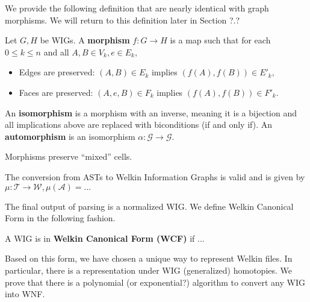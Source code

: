 We provide the following definition that are nearly identical with graph morphisms. We will return to this definition later in Section ?.?
\begin{definition} Let $G, H$ be WIGs. A \textbf{morphism} $f: G \to H$ is a map such that for each $0 \leq k \leq n$ and all $A, B \in V_{k}, e \in E_{k},$
  \begin{itemize}
    \item Edges are preserved: $(A, B) \in E_{k}$ implies $(f(A), f(B)) \in E'_{k},$
    \item Faces are preserved: $(A, e, B) \in F_{k}$ implies $(f(A), f(B)) \in F'_{k}.$
  \end{itemize}
  An \textbf{isomorphism} is a morphism with an inverse, meaning it is a bijection and all implications above are replaced with biconditions (if and only if). An \textbf{automorphism} is an isomorphism $\alpha: \mathcal{G} \to \mathcal{G}.$
\end{definition}
\begin{lemma}
Morphisms preserve ``mixed'' cells.
\end{lemma}

\begin{lemma}
  The conversion from ASTs to Welkin Information Graphs is valid and is given by $\mu: \mathcal{T} \to \mathcal{W}, \mu(\mathcal{A}) = ...$
\end{lemma}

The final output of parsing is a normalized WIG. We define Welkin Canonical Form in the following fashion.
\begin{definition}
A WIG is in \textbf{Welkin Canonical Form (WCF)} if ...
\end{definition}
Based on this form, we have chosen a unique way to represent Welkin files. In particular, there is a representation under WIG (generalized) homotopies. We prove that there is a polynomial (or exponential?) algorithm to convert any WIG into WNF.

